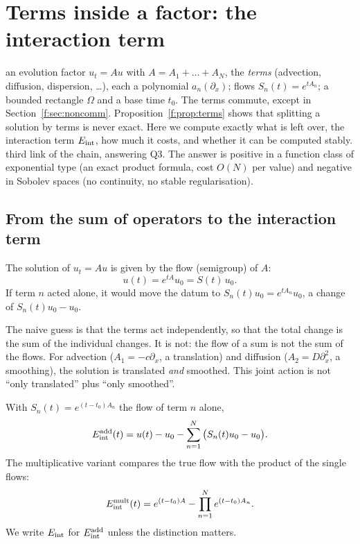 \section{Terms inside a factor: the interaction term}\label{f:ch:interaction}
\sectionbrief
{an evolution factor $u_t=Au$ with $A=A_1+\dots+A_N$, the \emph{terms} (advection, diffusion, dispersion, \dots), each a polynomial $a_n(\partial_x)$; flows $S_n(t)=e^{tA_n}$; a bounded rectangle $\Omega$ and a base time $t_0$. The terms commute, except in Section~\ref{f:sec:noncomm}.}
{Proposition~\ref{f:prop:terms} shows that splitting a solution by terms is never exact. Here we compute exactly what is left over, the interaction term $E_{\mathrm{int}}$, how much it costs, and whether it can be computed stably.}
{third link of the chain, answering Q3. The answer is positive in a function class of exponential type (an exact product formula, cost $O(N)$ per value) and negative in Sobolev spaces (no continuity, no stable regularisation).}

\subsection{From the sum of operators to the interaction term}

The solution of $u_t=Au$ is given by the flow (semigroup) of $A$:
\[
u(t)=e^{tA}u_0=S(t)\,u_0 .
\]
If term $n$ acted alone, it would move the datum to $S_n(t)u_0=e^{tA_n}u_0$, a change of $S_n(t)u_0-u_0$.

The naive guess is that the terms act independently, so that the total change is the sum of the individual changes. It is not: the flow of a sum is not the sum of the flows. For advection ($A_1=-c\partial_x$, a translation) and diffusion ($A_2=D\partial_x^2$, a smoothing), the solution is translated \emph{and} smoothed. This joint action is not ``only translated'' plus ``only smoothed''.

\begin{definition}\label{def:eint}
With $S_n(t)=e^{(t-t_0)A_n}$ the flow of term $n$ alone,
\begin{equation}\label{f:eq:eint-def}
E_{\mathrm{int}}^{\mathrm{add}}(t)=u(t)-u_0-\sum_{n=1}^N\big(S_n(t)u_0-u_0\big).
\end{equation}
The multiplicative variant compares the true flow with the product of the single flows:
\[
E_{\mathrm{int}}^{\mathrm{mult}}(t)=e^{(t-t_0)A}-\prod_{n=1}^Ne^{(t-t_0)A_n}.
\]
We write $E_{\mathrm{int}}$ for $E_{\mathrm{int}}^{\mathrm{add}}$ unless the distinction matters.
\end{definition}

